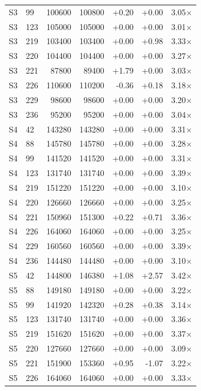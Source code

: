 \begin{longtable}{llrrrrr}
S3 & 99 & 100600 & 100800 & +0.20 & +0.00 & 3.05$\times$ \\
S3 & 123 & 105000 & 105000 & +0.00 & +0.00 & 3.01$\times$ \\
S3 & 219 & 103400 & 103400 & +0.00 & +0.98 & 3.33$\times$ \\
S3 & 220 & 104400 & 104400 & +0.00 & +0.00 & 3.27$\times$ \\
S3 & 221 & 87800 & 89400 & +1.79 & +0.00 & 3.03$\times$ \\
S3 & 226 & 110600 & 110200 & -0.36 & +0.18 & 3.18$\times$ \\
S3 & 229 & 98600 & 98600 & +0.00 & +0.00 & 3.20$\times$ \\
S3 & 236 & 95200 & 95200 & +0.00 & +0.00 & 3.04$\times$ \\
S4 & 42 & 143280 & 143280 & +0.00 & +0.00 & 3.31$\times$ \\
S4 & 88 & 145780 & 145780 & +0.00 & +0.00 & 3.28$\times$ \\
S4 & 99 & 141520 & 141520 & +0.00 & +0.00 & 3.31$\times$ \\
S4 & 123 & 131740 & 131740 & +0.00 & +0.00 & 3.39$\times$ \\
S4 & 219 & 151220 & 151220 & +0.00 & +0.00 & 3.10$\times$ \\
S4 & 220 & 126660 & 126660 & +0.00 & +0.00 & 3.25$\times$ \\
S4 & 221 & 150960 & 151300 & +0.22 & +0.71 & 3.36$\times$ \\
S4 & 226 & 164060 & 164060 & +0.00 & +0.00 & 3.25$\times$ \\
S4 & 229 & 160560 & 160560 & +0.00 & +0.00 & 3.39$\times$ \\
S4 & 236 & 144480 & 144480 & +0.00 & +0.00 & 3.10$\times$ \\
S5 & 42 & 144800 & 146380 & +1.08 & +2.57 & 3.42$\times$ \\
S5 & 88 & 149180 & 149180 & +0.00 & +0.00 & 3.22$\times$ \\
S5 & 99 & 141920 & 142320 & +0.28 & +0.38 & 3.14$\times$ \\
S5 & 123 & 131740 & 131740 & +0.00 & +0.00 & 3.36$\times$ \\
S5 & 219 & 151620 & 151620 & +0.00 & +0.00 & 3.37$\times$ \\
S5 & 220 & 127660 & 127660 & +0.00 & +0.00 & 3.09$\times$ \\
S5 & 221 & 151900 & 153360 & +0.95 & -1.07 & 3.22$\times$ \\
S5 & 226 & 164060 & 164060 & +0.00 & +0.00 & 3.33$\times$ \\

\end{longtable}
